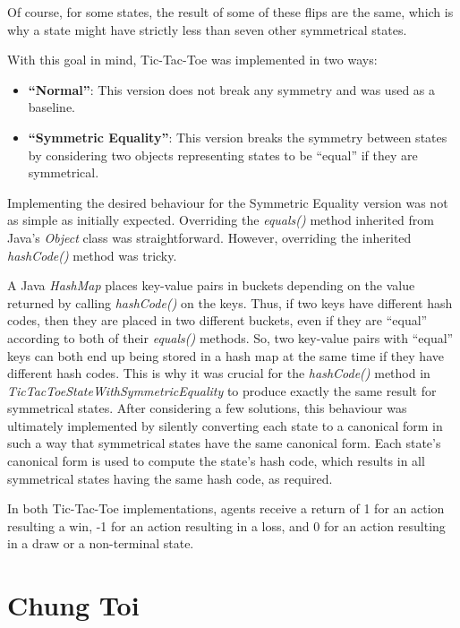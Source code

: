 \documentclass[11pt,a4paper]{report}
\begin{document}
Of course, for some states, the result of some of these flips are the same, which is why a state might have strictly less than seven other symmetrical states.

With this goal in mind, Tic-Tac-Toe was implemented in two ways:

\begin{itemize}

	\item \textbf{``Normal''}:
This version does not break any symmetry and was used as a baseline.

	\item \textbf{``Symmetric Equality''}: 
This version breaks the symmetry between states by considering two objects representing states to be ``equal'' if they are symmetrical.

\end{itemize}

Implementing the desired behaviour for the Symmetric Equality version was not as simple as initially expected. Overriding the \emph{equals()} method inherited from Java's \emph{Object} class was straightforward. However, overriding the inherited \emph{hashCode()} method was tricky.

A Java \emph{HashMap} places key-value pairs in buckets depending on the value returned by calling \emph{hashCode()} on the keys. Thus, if two keys have different hash codes, then they are placed in two different buckets, even if they are ``equal'' according to both of their \emph{equals()} methods. So, two key-value pairs with ``equal'' keys can both end up being stored in a hash map at the same time if they have different hash codes. This is why it was crucial for the \emph{hashCode()} method in \emph{TicTacToeStateWithSymmetricEquality} to produce exactly the same result for symmetrical states. After considering a few solutions, this behaviour was ultimately implemented by silently converting each state to a canonical form in such a way that symmetrical states have the same canonical form. Each state's canonical form is used to compute the state's hash code, which results in all symmetrical states having the same hash code, as required.

In both Tic-Tac-Toe implementations, agents receive a return of 1 for an action resulting a win, -1 for an action resulting in a loss, and 0 for an action resulting in a draw or a non-terminal state.


\section{Chung Toi}
\label{sec:ChungToi}
\end{document}
